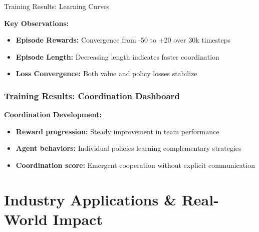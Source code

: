 \documentclass[aspectratio=169]{beamer}
\begin{document}
\begin{frame}{Training Results: Learning Curves}
    
    \begin{center}
        
    \end{center}
    
    \textbf{Key Observations:}
    \begin{itemize}
        \item \textbf{Episode Rewards:} Convergence from -50 to +20 over 30k timesteps
        \item \textbf{Episode Length:} Decreasing length indicates faster coordination
        \item \textbf{Loss Convergence:} Both value and policy losses stabilize
    \end{itemize}
\end{frame}

\begin{frame}
    \frametitle{Training Results: Coordination Dashboard}
    
    \begin{center}
        
    \end{center}
    
    \textbf{Coordination Development:}
    \begin{itemize}
        \item \textbf{Reward progression:} Steady improvement in team performance
        \item \textbf{Agent behaviors:} Individual policies learning complementary strategies
        \item \textbf{Coordination score:} Emergent cooperation without explicit communication
    \end{itemize}
\end{frame}

\section{Industry Applications \& Real-World Impact}
\end{document}
